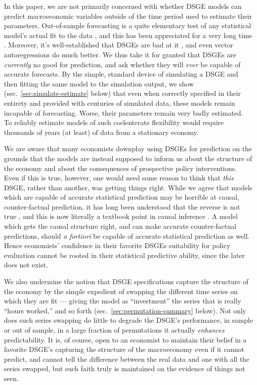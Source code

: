 \documentclass[11pt]{article}
\begin{document}
In this paper, we are not primarily concerned with whether DSGE models
can predict macroeconomic variables outside of the time period used to
estimate their parameters. Out-of-sample forecasting is a quite
elementary test of any statistical model's actual fit to the data
\citep{tEoSL-2nd}, and this has been appreciated for a very long time
\citep{Stone1974,Geisser-predictive-sample-reuse,Geisser-Eddy-predictive-approach}.
Moreover, it's well-established that DSGEs are bad at it
\citep{Edge-Gurkaynak-on-dsges}, and even vector autoregressions do much
better. We thus take it for granted that DSGEs are \emph{currently} no
good for prediction, and ask whether they will \emph{ever} be capable of
accurate forecasts. By the simple, standard device of simulating a DSGE
and then fitting the same model to the simulation output, we show
(sec.~\ref{sec:simulate-estimate} below) that even when correctly
specified in their entirety and provided with centuries of simulated
data, these models remain incapable of forecasting. Worse, their
parameters remain very badly estimated. To reliably estimate models of
such coelenterate flexibility would require thousands of years (at
least) of data from a stationary economy.

We are aware that many economists downplay using DSGEs for prediction on
the grounds that the models are instead supposed to inform us about the
structure of the economy and about the consequences of prospective
policy interventions. Even if this is true, however, one would need some
reason to think that \emph{this} DSGE, rather than another, was getting
things right. While we agree that models which are capable of accurate
statistical prediction may be horrible at causal, counter-factual
prediction, it has long been understood that the reverse is not true
\citep{Spirtes-Glymour-Scheines-1st, Pearl-causality}, and this is now
literally a textbook point in causal inference
\citep{Morgan-Winship-counterfactuals-2nd}. A model which gets the
causal structure right, and can make accurate counter-factual
predictions, should \emph{a fortiori} be capable of accurate statistical
prediction as well. Hence economists' confidence in their favorite DSGEs
suitability for policy evaluation cannot be rooted in their statistical
predictive ability, since the later does not exist.

We also undermine the notion that DSGE specifications capture the
structure of the economy by the simple expedient of swapping the
different time series on which they are fit --- giving the model as
``investment'' the series that is really ``hours worked,'' and so forth
(sec.~\ref{sec:permutation-summary} below). Not only does such series
swapping do little to degrade the DSGE's performance, in sample or out
of sample, in a large fraction of permutations it actually
\emph{enhances} predictability. It is, of course, open to an economist
to maintain their belief in a favorite DSGE's capturing the structure of
the macroeconomy even if it cannot predict, and cannot tell the
difference between the real data and one with all the series swapped,
but such faith truly is maintained on the evidence of things not seen.
\end{document}
